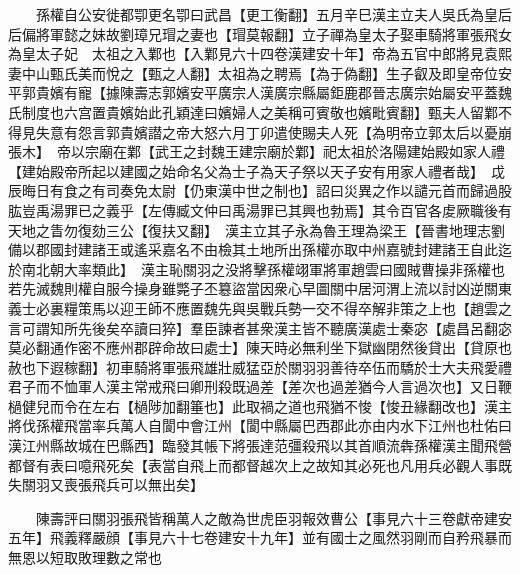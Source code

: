 　　孫權自公安徙都卾更名卾曰武昌【更工衡翻】五月辛巳漢主立夫人吳氏為皇后后偏將軍懿之妹故劉璋兄瑁之妻也【瑁莫報翻】立子禪為皇太子娶車騎將軍張飛女為皇太子妃　太祖之入鄴也【入鄴見六十四卷漢建安十年】帝為五官中郎將見袁熙妻中山甄氏美而悅之【甄之人翻】太祖為之聘焉【為于偽翻】生子叡及即皇帝位安平郭貴嬪有寵【據陳壽志郭嬪安平廣宗人漢廣宗縣屬鉅鹿郡晉志廣宗始屬安平蓋魏氏制度也六宫置貴嬪始此孔穎達曰嬪婦人之美稱可賓敬也嬪毗賓翻】甄夫人留鄴不得見失意有怨言郭貴嬪譛之帝大怒六月丁卯遣使賜夫人死【為明帝立郭太后以憂崩張木】　帝以宗廟在鄴【武王之封魏王建宗廟於鄴】祀太祖於洛陽建始殿如家人禮【建始殿帝所起以建國之始命名父為士子為天子祭以天子安有用家人禮者哉】　戉辰晦日有食之有司奏免太尉【仍東漢中世之制也】詔曰災異之作以譴元首而歸過股肱豈禹湯罪已之義乎【左傳臧文仲曰禹湯罪已其興也勃焉】其令百官各䖍厥職後有天地之眚勿復劾三公【復扶又翻】　漢主立其子永為魯王理為梁王【晉書地理志劉備以郡國封建諸王或遙采嘉名不由檢其土地所出孫權亦取中州嘉號封建諸王自此迄於南北朝大率類此】　漢主恥關羽之没將擊孫權翊軍將軍趙雲曰國賊曹操非孫權也若先滅魏則權自服今操身雖斃子丕簒盜當因衆心早圖關中居河渭上流以討凶逆關東義士必裏糧策馬以迎王師不應置魏先與吳戰兵勢一交不得卒解非策之上也【趙雲之言可謂知所先後矣卒讀曰猝】羣臣諫者甚衆漢主皆不聽廣漢處士秦宓【處昌呂翻宓莫必翻通作密不應州郡辟命故曰處士】陳天時必無利坐下獄幽閉然後貸出【貸原也赦也下遐稼翻】初車騎將軍張飛雄壯威猛亞於關羽羽善待卒伍而驕於士大夫飛愛禮君子而不恤軍人漢主常戒飛曰卿刑殺既過差【差次也過差猶今人言過次也】又日鞭檛健兒而令在左右【檛陟加翻箠也】此取禍之道也飛猶不悛【悛丑緣翻改也】漢主將伐孫權飛當率兵萬人自閬中會江州【閬中縣屬巴西郡此亦由内水下江州也杜佑曰漢江州縣故城在巴縣西】臨發其帳下將張達范彊殺飛以其首順流犇孫權漢主聞飛營都督有表曰噫飛死矣【表當自飛上而都督越次上之故知其必死也凡用兵必觀人事既失關羽又喪張飛兵可以無出矣】

　　陳壽評曰關羽張飛皆稱萬人之敵為世虎臣羽報效曹公【事見六十三卷獻帝建安五年】飛義釋嚴顔【事見六十七卷建安十九年】並有國士之風然羽剛而自矜飛暴而無恩以短取敗理數之常也

